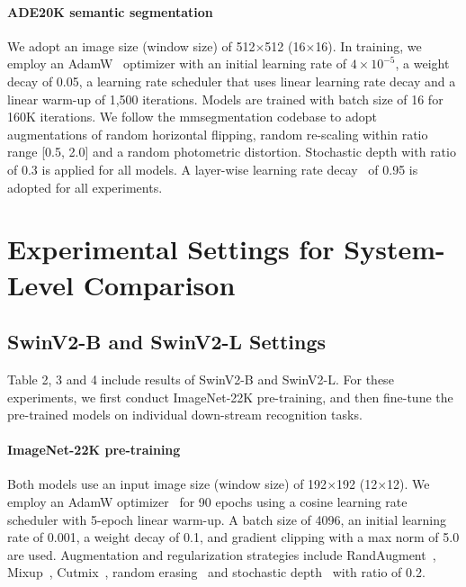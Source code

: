 \documentclass[10pt,twocolumn,letterpaper]{article}
\begin{document}
\paragraph{ADE20K semantic segmentation}
We adopt an image size (window size) of 512$\times$512 (16$\times$16). In training, we employ an AdamW~\cite{loshchilov2017decoupled} optimizer with an initial learning rate of $4\times10^{-5}$, a weight decay of 0.05, a learning rate scheduler that uses linear learning rate decay and a linear warm-up of 1,500 iterations. Models are trained with batch size of 16 for 160K iterations. We follow the mmsegmentation codebase to adopt augmentations of random horizontal flipping, random re-scaling within ratio range [0.5, 2.0] and a random photometric distortion. Stochastic depth with ratio of $0.3$ is applied for all models. A layer-wise learning rate decay~\cite{bao2021beit} of 0.95 is adopted for all experiments.

\section{Experimental Settings for System-Level Comparison}

\subsection{SwinV2-B and SwinV2-L Settings}

Table 2, 3 and 4 include results of SwinV2-B and SwinV2-L. For these experiments, we first conduct ImageNet-22K pre-training, and then fine-tune the pre-trained models on individual down-stream recognition tasks.

\paragraph{ImageNet-22K pre-training} 

Both models use an input image size (window size) of 192$\times$192 (12$\times$12). 
We employ an AdamW optimizer~\cite{loshchilov2017decoupled} for 90 epochs using a cosine learning rate scheduler with 5-epoch linear warm-up. A batch size of 4096, an initial learning rate of 0.001, a weight decay of 0.1, and gradient clipping with a max norm of 5.0 are used. Augmentation and regularization strategies include RandAugment~\cite{cubuk2020randaugment}, Mixup~\cite{zhang2017mixup}, Cutmix~\cite{yun2019cutmix}, random erasing~\cite{zhong2020random} and stochastic depth~\cite{huang2016deep} with ratio of 0.2.
\end{document}
